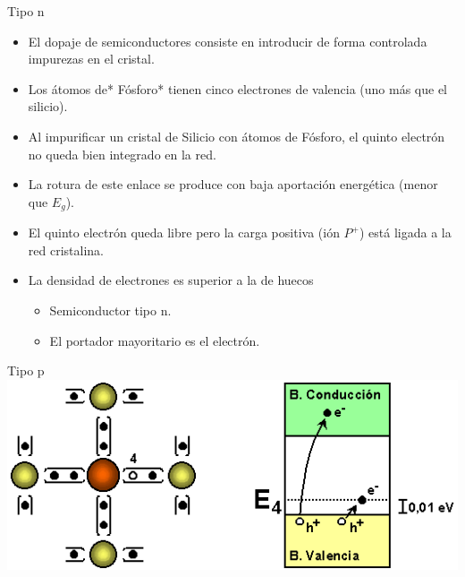 \documentclass[xcolor={usenames,svgnames,dvipsnames}]{beamer}
\begin{document}
\begin{frame}[label=sec-1-3-2]{Tipo n}
\begin{itemize}
\item El \alert{dopaje de semiconductores} consiste en introducir de forma
controlada impurezas en el cristal.

\item Los átomos de* Fósforo* tienen cinco electrones de valencia (uno más
que el silicio).

\item Al impurificar un cristal de Silicio con átomos de Fósforo, el quinto
electrón no queda bien integrado en la red.

\item La rotura de este enlace se produce con \alert{baja aportación energética}
   (menor que $E_{g}$).

\item El \alert{quinto electrón queda libre pero la carga positiva (ión $P^{+}$)
está ligada} a la red cristalina.

\item La \alert{densidad de electrones es superior a la de huecos}

\begin{itemize}
\item Semiconductor \alert{tipo n}.

\item El \alert{portador mayoritario} es el \alert{electrón}.
\end{itemize}
\end{itemize}
\end{frame}

\begin{frame}[label=sec-1-3-3]{Tipo p}
\includegraphics[width=.9\linewidth]{../figs/Semiconductor_tipo_p.png}
\end{frame}
\end{document}
